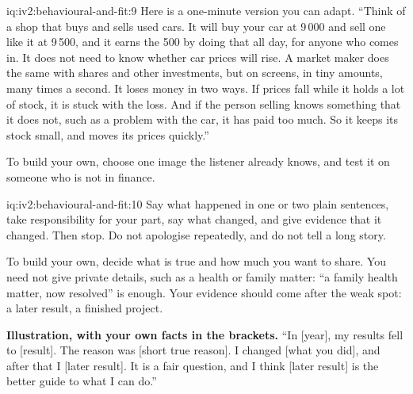 \begin{solution}{iq:iv2:behavioural-and-fit:9}
Here is a one-minute version you can adapt. ``Think of a shop that buys and sells used cars. It will buy your car at 9\,000 and sell one like it at 9\,500, and it earns the 500 by doing that all day, for anyone who comes in. It does not need to know whether car prices will rise. A market maker does the same with shares and other investments, but on screens, in tiny amounts, many times a second. It loses money in two ways. If prices fall while it holds a lot of stock, it is stuck with the loss. And if the person selling knows something that it does not, such as a problem with the car, it has paid too much. So it keeps its stock small, and moves its prices quickly.''

To build your own, choose one image the listener already knows, and test it on someone who is not in finance.

\end{solution}

\begin{solution}{iq:iv2:behavioural-and-fit:10}
Say what happened in one or two plain sentences, take responsibility for your part, say what changed, and give evidence that it changed. Then stop. Do not apologise repeatedly, and do not tell a long story.

To build your own, decide what is true and how much you want to share. You need not give private details, such as a health or family matter: ``a family health matter, now resolved'' is enough. Your evidence should come after the weak spot: a later result, a finished project.

\textbf{Illustration, with your own facts in the brackets.} ``In [year], my results fell to [result]. The reason was [short true reason]. I changed [what you did], and after that I [later result]. It is a fair question, and I think [later result] is the better guide to what I can do.''

\end{solution}

